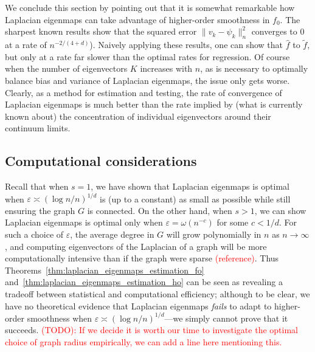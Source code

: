\documentclass{article}
\newcommand{\1}{\mathbf{1}}
\newcommand{\wt}[1]{\widetilde{#1}}
\newcommand{\wh}[1]{\widehat{#1}}
\theoremstyle{alden}
\theoremstyle{aldenthm}
\theoremstyle{definition}
\theoremstyle{remark}
\begin{document}
We conclude this section by pointing out that it is somewhat remarkable how Laplacian eigenmaps can take advantage of higher-order smoothness in $f_0$. The sharpest known results \citep{calder2019,cheng2021} show that the squared error $\|v_k - \psi_k\|_n^2$ converges to $0$ at a rate of $n^{-2/(4 + d)}$). Naively applying these results, one can show that $\wh{f}$ to $\wt{f}$, but only at a rate far slower than the optimal rates for regression. Of course when the number of eigenvectors $K$ increases with $n$, as is necessary to optimally balance bias and variance of Laplacian eigenmaps, the issue only gets worse. Clearly, as a method for estimation and testing, the rate of convergence of Laplacian eigenmaps is much better than the rate implied by (what is currently known about) the concentration of individual eigenvectors around their continuum limits.

\subsection{Computational considerations}
Recall that when $s = 1$, we have shown that Laplacian eigenmaps is optimal when $\varepsilon \asymp (\log n/n)^{1/d}$ is (up to a constant) as small as possible while still ensuring the graph $G$ is connected. On the other hand, when $s > 1$, we can show Laplacian eigenmaps is optimal only when $\varepsilon = \omega(n^{-c})$ for some $c < 1/d$. For such a choice of $\varepsilon$, the average degree in $G$ will grow polynomially in $n$ as $n \to \infty$, and computing eigenvectors of the Laplacian of a graph will be more computationally intensive than if the graph were sparse \textcolor{red}{(reference)}. Thus Theorems~\ref{thm:laplacian_eigenmaps_estimation_fo} and~\ref{thm:laplacian_eigenmaps_estimation_ho} can be seen as revealing a tradeoff between statistical and computational efficiency; although to be clear, we have no theoretical evidence that Laplacian eigenmaps \emph{fails} to adapt to higher-order smoothness when $\varepsilon \asymp (\log n/n)^{1/d}$---we simply cannot prove that it succeeds. 
\textcolor{red}{(TODO): If we decide it is worth our time to investigate the optimal choice of graph radius empirically, we can add a line here mentioning this.}
\end{document}
